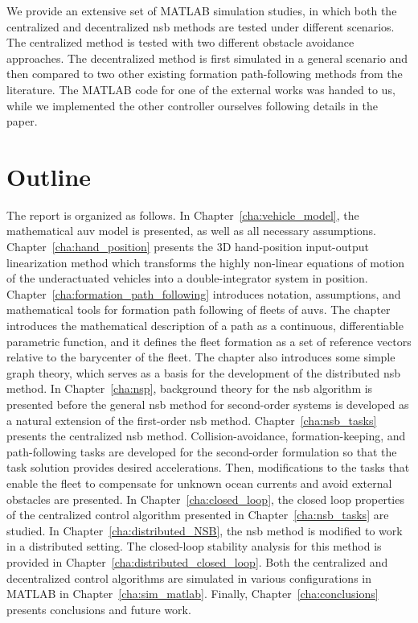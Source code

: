 We provide an extensive set of MATLAB simulation studies, in which both the centralized and decentralized \gls{nsb} methods are tested under different scenarios. The centralized method is tested with two different obstacle avoidance approaches. The decentralized method is first simulated in a general scenario and then compared to two other existing formation path-following methods from the literature. The MATLAB code for one of the external works was handed to us, while we implemented the other controller ourselves following details in the paper.

\section{Outline}\label{sec:outline}
The report is organized as follows. In Chapter~\ref{cha:vehicle_model}, the mathematical \gls{auv} model is presented, as well as all necessary assumptions. Chapter~\ref{cha:hand_position} presents the 3D hand-position input-output linearization method which transforms the highly non-linear equations of motion of the underactuated vehicles into a double-integrator system in position. Chapter~\ref{cha:formation_path_following} introduces notation, assumptions, and mathematical tools for formation path following of fleets of \glspl{auv}. The chapter introduces the mathematical description of a path as a continuous, differentiable parametric function, and it defines the fleet formation as a set of reference vectors relative to the barycenter of the fleet. The chapter also introduces some simple graph theory, which serves as a basis for the development of the distributed \gls{nsb} method.  In Chapter~\ref{cha:nsp}, background theory for the \gls{nsb} algorithm is presented before the general \gls{nsb} method for second-order systems is developed as a natural extension of the first-order \gls{nsb} method. Chapter~\ref{cha:nsb_tasks} presents the centralized \gls{nsb} method. Collision-avoidance, formation-keeping, and path-following tasks are developed for the second-order formulation so that the task solution provides desired accelerations. Then, modifications to the tasks that enable the fleet to compensate for unknown ocean currents and avoid external obstacles are presented. In Chapter~\ref{cha:closed_loop}, the closed loop properties of the centralized control algorithm presented in Chapter~\ref{cha:nsb_tasks} are studied. In Chapter~\ref{cha:distributed_NSB}, the \gls{nsb} method is modified to work in a distributed setting. The closed-loop stability analysis for this method is provided in Chapter~\ref{cha:distributed_closed_loop}. Both the centralized and decentralized control algorithms are simulated in various configurations in MATLAB \citep{matlab_2022} in Chapter~\ref{cha:sim_matlab}.  Finally, Chapter~\ref{cha:conclusions} presents conclusions and future work.
